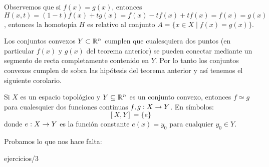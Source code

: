 \documentclass[../../topologia_algebraica.tex]{subfiles}
\begin{document}
\begin{nota}
  Observemos que si $f(x)=g(x)$, entonces $H(x,t)=(1-t)f(x)+tg(x)=f(x)-tf(x)+tf(x)=f(x)=g(x)$,
  entonces la homotop\'ia $H$ es relativo al conjunto $A=\{x\in X \mid f(x)=g(x)\}$.
\end{nota}

Los conjuntos convexos $Y\subset\mathbb{R}^n$ cumplen que cualesquiera dos puntos (en particular $f(x)$ y
$g(x)$ del teorema anterior) se pueden conectar mediante un segmento de recta completamente contenido
en $Y$. Por lo tanto los conjuntos convexos cumplen de sobra las hip\'otesis del teorema anterior y
as\'i tenemos el siguiente corolario.

\begin{cor}\label{cor:homotopias_convexos}
  Si $X$ es un espacio topol\'ogico y $Y\subseteq\mathbb{R}^n$ es un conjunto convexo, entonces
  $f\simeq g$ para cualesquier dos funciones continuas $f,g:X\rightarrow Y$. En s\'imbolos:
  \[
    [X,Y]=\{e\}
  \]
  donde $e:X\rightarrow Y$ es la funci\'on constante $e(x)=y_0$ para cualquier $y_0\in Y$.
\end{cor}

Probamos lo que nos hace falta:

{ejercicios/3} %
\end{document}
